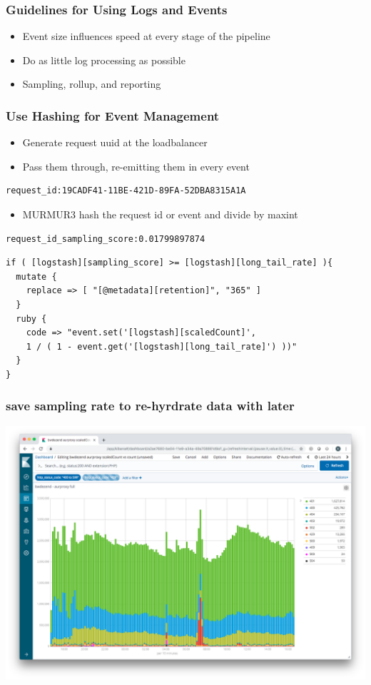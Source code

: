 \begin{frame}
    \frametitle{Guidelines for Using Logs and Events}
    \begin{itemize}
        \item Event size influences speed at every stage of the pipeline
        \item Do as little log processing as possible
        \item Sampling, rollup, and reporting
    \end{itemize}
\end{frame}

\begin{frame}[fragile]
    \frametitle{Use Hashing for Event Management}
    \begin{itemize}
        \item Generate request uuid at the loadbalancer
        \item Pass them through, re-emitting them in every event
    \end{itemize}
    \begin{lstlisting}
request_id:19CADF41-11BE-421D-89FA-52DBA8315A1A
    \end{lstlisting}
    \begin{itemize}
        \item MURMUR3 hash the request id or event and divide by maxint
    \end{itemize}
    \begin{lstlisting}
request_id_sampling_score:0.01799897874
    \end{lstlisting}

    \begin{lstlisting}
if ( [logstash][sampling_score] >= [logstash][long_tail_rate] ){
  mutate {
    replace => [ "[@metadata][retention]", "365" ]
  }
  ruby {
    code => "event.set('[logstash][scaledCount]',
    1 / ( 1 - event.get('[logstash][long_tail_rate]') ))"
  }
}
\end{lstlisting}
        
\end{frame}

\begin{frame}
    \frametitle{save sampling rate to re-hyrdrate data with later}
    \begin{center}
        \includegraphics[width=0.8\linewidth]{query-full.png}
    \end{center}
\end{frame}

